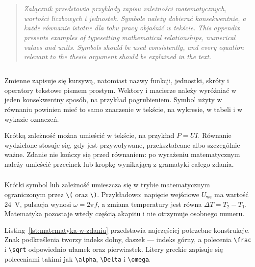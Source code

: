 \chapter{}
\label{app:rownania}

\begin{quote}
\itshape
\ploren
  {Załącznik przedstawia przykłady zapisu zależności matematycznych, wartości liczbowych i jednostek. Symbole należy dobierać konsekwentnie, a każde równanie istotne dla toku pracy objaśnić w tekście.}
  {This appendix presents examples of typesetting mathematical relationships, numerical values and units. Symbols should be used consistently, and every equation relevant to the thesis argument should be explained in the text.}
\end{quote}

\section{}

Zmienne zapisuje się kursywą, natomiast nazwy funkcji, jednostki, skróty i operatory
tekstowe pismem prostym. Wektory i macierze należy wyróżniać w jeden konsekwentny sposób,
na przykład pogrubieniem. Symbol użyty w równaniu powinien mieć to samo znaczenie w
tekście, na wykresie, w tabeli i w wykazie oznaczeń.

Krótką zależność można umieścić w tekście, na przykład $P=UI$. Równanie wydzielone
stosuje się, gdy jest przywoływane, przekształcane albo szczególnie ważne. Zdanie nie
kończy się przed równaniem: po wyrażeniu matematycznym należy umieścić przecinek lub
kropkę wynikającą z gramatyki całego zdania.

\subsection{}

Krótki symbol lub zależność umieszcza się w trybie matematycznym ograniczonym przez
\verb|\(| oraz \verb|\)|. Przykładowo: napięcie wejściowe \(U_{\mathrm{we}}\) ma
wartość \SI{24}{\volt}, pulsacja wynosi \(\omega=2\pi f\), a zmiana temperatury jest
równa \(\Delta T=T_2-T_1\). Matematyka pozostaje wtedy częścią akapitu i nie otrzymuje
osobnego numeru.

Listing~\ref{lst:matematyka-w-zdaniu} przedstawia najczęściej potrzebne konstrukcje.
Znak podkreślenia tworzy indeks dolny, daszek --- indeks górny, a polecenia
\verb|\frac| i \verb|\sqrt| odpowiednio ułamek oraz pierwiastek. Litery greckie
zapisuje się poleceniami takimi jak \verb|\alpha|, \verb|\Delta| i \verb|\omega|.

